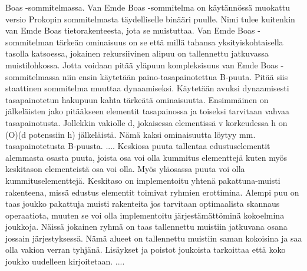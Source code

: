 \documentclass[finnish]{tktltiki2}
\theoremstyle{definition}
\theoremstyle{remark}
\begin{document}
Boas -sommitelmassa. Van Emde Boas -sommitelma on käytännössä muokattu versio
Prokopin sommitelmasta täydelliselle binääri puulle. Nimi tulee kuitenkin van
Emde Boas tietorakenteesta, jota se muistuttaa. Van Emde Boas -sommitelman
tärkeän ominaisuus on se että millä tahansa yksityiskohtaisella tasolla
katsoessa, jokainen rekursiivinen alipuu on tallennettu jatkuvassa
muistilohkossa. Jotta voidaan pitää yläpuun kompleksisuus van Emde Boas
-sommitelmassa niin ensin käytetään paino-tasapainotettua B-puuta. Pitää siis
staattinen sommitelma muuttaa dynaamiseksi. Käytetään avuksi dynaamisesti
tasapainotetun hakupuun kahta tärkeätä ominaisuutta. Ensimmäinen on
jälkeläisten jako pitääkseen elementit tasapainossa ja toiseksi tarvitaan
vahvaa tasapainotusta. Jollekkin vakiolle d, jokaisessa elementissä v
korkeudessa h on (O)(d potenssiin h) jälkeläistä. Nämä kaksi ominaisuutta
löytyy mm. tasapainotetusta B-puusta. ....
\newline \indent Keskiosa puuta tallentaa edustuselementit alemmasta osasta puuta, joista osa
voi olla kummitus elementtejä kuten myös keskitason elementeistä osa voi olla.
Myös yläosassa puuta voi olla kummituselementtejä. Keskitaso on implementoitu
yhtenä pakattuna-muisti rakenteena, missä edustus elementit toimivat ryhmien
erottimina. Alempi puu on taas joukko pakattuja muisti rakenteita jos
tarvitaan optimaalista skannaus operaatiota, muuten se voi olla implementoitu
järjestämättöminä kokoelmina joukkoja. Näissä jokainen ryhmä on taas
tallennettu muistiin jatkuvana osana jossain järjestyksessä. Nämä alueet on
tallennettu muistiin saman kokoisina ja saa olla vakion verran tyhjänä.
Lisäykset ja poistot joukoista tarkoittaa että koko joukko uudelleen
kirjoitetaan. ....



%
%
% 
%

% 
% 
\end{document}
